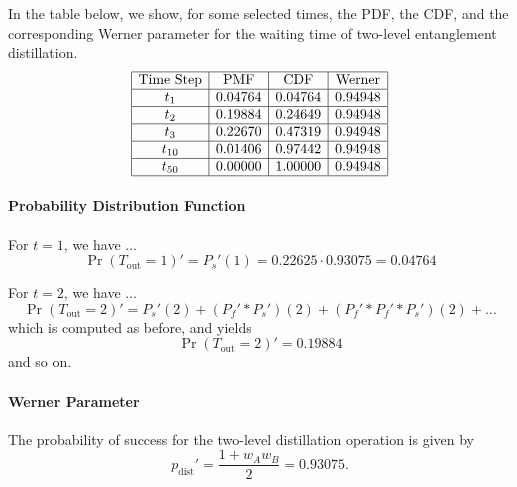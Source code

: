 \documentclass{masterthesis}
\begin{document}
In the table below, we show, for some selected times, the PDF, the CDF, and the corresponding Werner parameter for the waiting time of two-level entanglement distillation.
\begin{equation*}
    \begin{array}{|c|c|c|c|}
        \hline
        \text{Time Step} & \text{PMF} & \text{CDF} & \text{Werner} \\
        \hline
        t_1 & 0.04764 & 0.04764 & 0.94948 \\
        \hline
        t_2 & 0.19884 & 0.24649 & 0.94948 \\
        \hline
        t_3 & 0.22670 & 0.47319 & 0.94948 \\
        \hline
        t_{10} & 0.01406 & 0.97442 & 0.94948 \\
        \hline
        t_{50} & 0.00000 & 1.00000 & 0.94948 \\
        \hline
    \end{array}
\end{equation*}

\paragraph*{Probability Distribution Function}

For $t = 1$, we have ...
\begin{equation}
    \Pr(T_{\text{out}} = 1)' = P_s'(1) = 0.22625 \cdot 0.93075 = 0.04764 
\end{equation}

For $t = 2$, we have ...
\begin{equation}
    \Pr(T_{\text{out}} = 2)' = P_s'(2) + (P_f' \ast P_s')(2) + (P_f' \ast P_f' \ast P_s')(2) + \ldots
\end{equation}
which is computed as before, and yields
\begin{equation}
    \Pr(T_{\text{out}} = 2)' = 0.19884
\end{equation}
and so on.

\paragraph*{Werner Parameter}

The probability of success for the two-level distillation operation is given by
\begin{equation}
    p_{\text{dist}}' = \frac{1 + w_A w_B}{2} = 0.93075 .
\end{equation}
\end{document}
